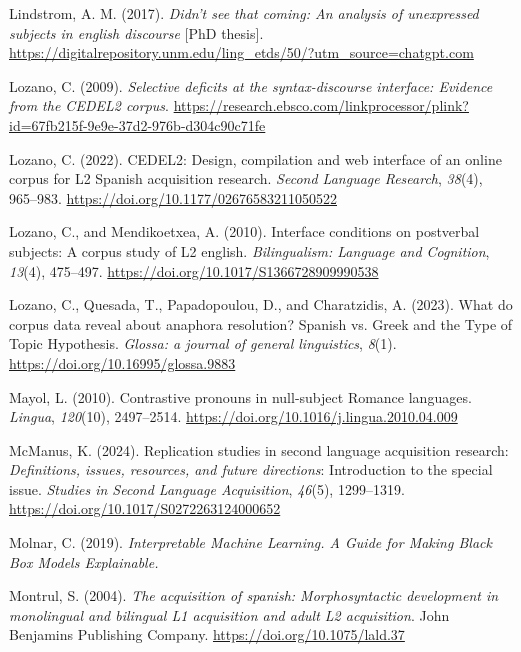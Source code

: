 \documentclass[
  letterpaper,
  DIV=11,
  numbers=noendperiod]{scrartcl}
\newlength{\cslhangindent}
\newenvironment{CSLReferences}[2] %
 {\begin{list}{}{%
  \setlength{\itemindent}{0pt}
  \setlength{\leftmargin}{0pt}
  \setlength{\parsep}{0pt}
  \ifodd #1
   \setlength{\leftmargin}{\cslhangindent}
   \setlength{\itemindent}{-1\cslhangindent}
  \fi
  \setlength{\itemsep}{#2\baselineskip}}}
 {\end{list}}
\begin{document}
\begin{CSLReferences}{1}{0}
Lindstrom, A. M. (2017). \emph{Didn't see that coming: An analysis of
unexpressed subjects in english discourse} {[}PhD thesis{]}.
\url{https://digitalrepository.unm.edu/ling_etds/50/?utm_source=chatgpt.com}

Lozano, C. (2009). \emph{Selective deficits at the syntax-discourse
interface: Evidence from the CEDEL2 corpus}.
\url{https://research.ebsco.com/linkprocessor/plink?id=67fb215f-9e9e-37d2-976b-d304c90c71fe}

Lozano, C. (2022). {CEDEL2}: {Design}, compilation and web interface of
an online corpus for {L2} {Spanish} acquisition research. \emph{Second
Language Research}, \emph{38}(4), 965--983.
\url{https://doi.org/10.1177/02676583211050522}

Lozano, C., and Mendikoetxea, A. (2010). Interface conditions on
postverbal subjects: A corpus study of L2 english. \emph{Bilingualism:
Language and Cognition}, \emph{13}(4), 475--497.
\url{https://doi.org/10.1017/S1366728909990538}

Lozano, C., Quesada, T., Papadopoulou, D., and Charatzidis, A. (2023).
What do corpus data reveal about anaphora resolution? Spanish vs. Greek
and the Type of Topic Hypothesis. \emph{Glossa: a journal of general
linguistics}, \emph{8}(1). \url{https://doi.org/10.16995/glossa.9883}

Mayol, L. (2010). Contrastive pronouns in null-subject {Romance}
languages. \emph{Lingua}, \emph{120}(10), 2497--2514.
\url{https://doi.org/10.1016/j.lingua.2010.04.009}

McManus, K. (2024). Replication studies in second language acquisition
research: {\emph{Definitions, issues, resources, and future
directions}}: Introduction to the special issue. \emph{Studies in Second
Language Acquisition}, \emph{46}(5), 1299--1319.
\url{https://doi.org/10.1017/S0272263124000652}

Molnar, C. (2019). \emph{Interpretable {Machine} {Learning}. {A} {Guide}
for {Making} {Black} {Box} {Models} {Explainable}.}

Montrul, S. (2004). \emph{The acquisition of spanish: Morphosyntactic
development in monolingual and bilingual L1 acquisition and adult L2
acquisition}. John Benjamins Publishing Company.
\url{https://doi.org/10.1075/lald.37}


\end{CSLReferences}
\end{document}
